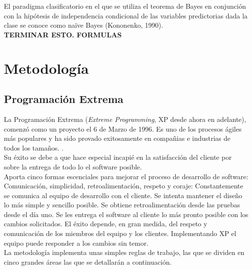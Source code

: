 	El paradigma clasificatorio en el que se utiliza el teorema de Bayes en conjunción con la hipótesis de independencia condicional de las variables predictorias dada la clase se conoce como naïve Bayes (Kononenko, 1990).\\

	\textbf{TERMINAR ESTO. FORMULAS}


\section{Metodología}
\label{sec:MetodologiaDetalle}

\subsection{Programación Extrema}
\label{subsec:XP}
La Programación Extrema (\textit{Extreme Programming}, XP desde ahora en adelante), comenzó como un proyecto el 6 de Marzo de 1996. Es uno de los procesos ágiles más populares y ha sido provado exitosamente en compañias e industrias de todos los tamaños. \cite{xP}.\\

Su éxito se debe a que hace especial incapié en la satisfacción del cliente por sobre la entrega de todo lo el software posible.\\

Aporta cinco formas escenciales para mejorar el proceso de desarrollo de software: Comunicación, simplicidad, retroalimentación, respeto y coraje: Constantemente se comunica al equipo de desarrollo con el cliente. Se intenta mantener el diseño lo más simple y sencillo posible. Se obtiene retroalimentación desde las pruebas desde el día uno. Se les entrega el software al cliente lo más pronto posible con los cambios solicitados. El éxito depende, en gran medida, del respeto y comunicación de los miembros del equipo y los clientes. Implementando XP el equipo puede responder a los cambios sin temor.\\

La metodología implementa unas simples reglas de trabajo, las que se dividen en cinco grandes áreas las que se detallarán a continuación.\\

